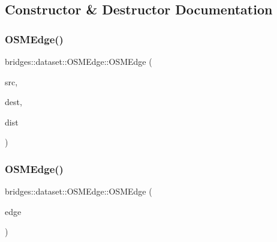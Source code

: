 \subsection{Constructor \& Destructor Documentation}
\mbox{\label{classbridges_1_1dataset_1_1_o_s_m_edge_a4b638a47d5cf8f1248d318b48bbbd5a0}} 
\subsubsection{\texorpdfstring{OSMEdge()}{OSMEdge()}\hspace{0.1cm}{\footnotesize\ttfamily [1/2]}}
{\footnotesize\ttfamily bridges\+::dataset\+::\+O\+S\+M\+Edge\+::\+O\+S\+M\+Edge (\begin{DoxyParamCaption}\item[{\mbox{\hyperlink{classbridges_1_1dataset_1_1_o_s_m_vertex_ad166f13b0aefbdc05a273546f2a3bb96}{O\+S\+M\+Vertex\+::\+O\+S\+M\+Vertex\+ID}}}]{src,  }\item[{\mbox{\hyperlink{classbridges_1_1dataset_1_1_o_s_m_vertex_ad166f13b0aefbdc05a273546f2a3bb96}{O\+S\+M\+Vertex\+::\+O\+S\+M\+Vertex\+ID}}}]{dest,  }\item[{double}]{dist }\end{DoxyParamCaption})\hspace{0.3cm}{\ttfamily [inline]}}

\mbox{\label{classbridges_1_1dataset_1_1_o_s_m_edge_a8e412f87ed35e5667987de457e5609b6}} 
\subsubsection{\texorpdfstring{OSMEdge()}{OSMEdge()}\hspace{0.1cm}{\footnotesize\ttfamily [2/2]}}
{\footnotesize\ttfamily bridges\+::dataset\+::\+O\+S\+M\+Edge\+::\+O\+S\+M\+Edge (\begin{DoxyParamCaption}\item[{const \mbox{\hyperlink{classbridges_1_1dataset_1_1_o_s_m_edge}{O\+S\+M\+Edge}} $\ast$}]{edge }\end{DoxyParamCaption})\hspace{0.3cm}{\ttfamily [inline]}}



